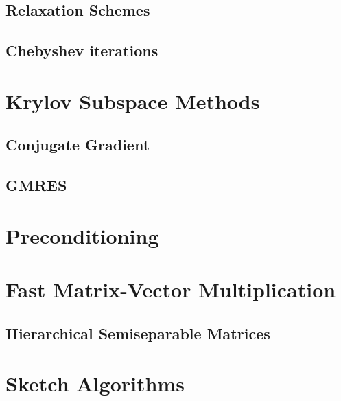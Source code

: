 \subsection{Relaxation Schemes}
\subsection{Chebyshev iterations}
\newpage
\section{Krylov Subspace Methods}
\subsection{Conjugate Gradient}
\subsection{GMRES}

\section{Preconditioning}

\section{Fast Matrix-Vector Multiplication}
\subsection{Hierarchical Semiseparable Matrices}


\section{Sketch Algorithms}

